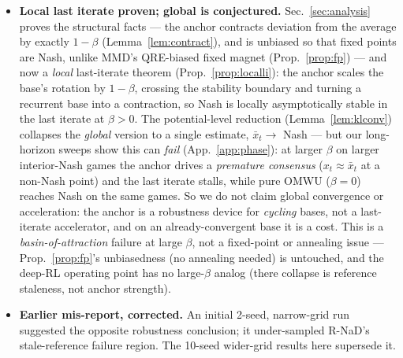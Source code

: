 \documentclass[10pt,twocolumn]{article}
\theoremstyle{plain}
\theoremstyle{remark}
\begin{document}
\begin{itemize}
  point of comparison for ``which moving reference.'' The full R-NaD behind
  DeepNash additionally runs an \emph{outer schedule} that updates the
  regularization policy and anneals the reward transform across convergence,
  partly to manage exactly the staleness we exploit. Our critique is of the
  fixed-schedule instantiation; whether it survives the scheduled version is open.
  We expect the schedule trades staleness for annealing-sensitivity --- a fixed
  $K$ becomes a schedule to tune, which is itself a hyperparameter-robustness cost
  --- but we have not measured this, and say so plainly.
  \item \textbf{Local last iterate proven; global is conjectured.}
  Sec.~\ref{sec:analysis} proves the structural facts --- the anchor contracts
  deviation from the average by exactly $1-\beta$ (Lemma~\ref{lem:contract}), and is
  unbiased so that fixed points are Nash, unlike MMD's QRE-biased fixed magnet
  (Prop.~\ref{prop:fp}) --- and now a \emph{local} last-iterate theorem
  (Prop.~\ref{prop:localli}): the anchor scales the base's rotation by $1-\beta$,
  crossing the stability boundary and turning a recurrent base into a contraction, so
  Nash is locally asymptotically stable in the last iterate at $\beta\!>\!0$. The
  potential-level reduction (Lemma~\ref{lem:klconv}) collapses the \emph{global} version
  to a single estimate, $\bar x_t\to$ Nash --- but our long-horizon sweeps show this can
  \emph{fail} (App.~\ref{app:phase}): at larger $\beta$ on larger interior-Nash games the
  anchor drives a \emph{premature consensus} ($x_t\!\approx\!\bar x_t$ at a non-Nash
  point) and the last iterate stalls, while pure OMWU ($\beta\!=\!0$) reaches Nash on the
  same games. So we do not claim global convergence or acceleration: the anchor is a
  robustness device for \emph{cycling} bases, not a last-iterate accelerator, and on an
  already-convergent base it is a cost. This is a \emph{basin-of-attraction} failure at
  large $\beta$, not a fixed-point or annealing issue --- Prop.~\ref{prop:fp}'s
  unbiasedness (no annealing needed) is untouched, and the deep-RL operating point has no
  large-$\beta$ analog (there collapse is reference staleness, not anchor strength).
  \item \textbf{Earlier mis-report, corrected.} An initial 2-seed, narrow-grid
  run suggested the opposite robustness conclusion; it under-sampled R-NaD's
  stale-reference failure region. The 10-seed wider-grid results here supersede
  it.
\end{itemize}
\end{document}
